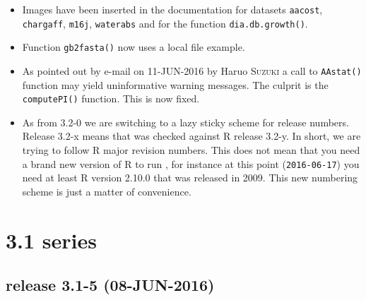 \documentclass{article}
\begin{document}
\begin{itemize}

\item Images have been inserted in the documentation for datasets
\texttt{aacost}, \texttt{chargaff}, \texttt{m16j}, \texttt{waterabs}
and for the function \texttt{dia.db.growth()}.

\item Function \texttt{gb2fasta()} now uses a local file example.

\item As pointed out by e-mail on 11-JUN-2016 by Haruo \textsc{Suzuki} a
call to \texttt{AAstat()} function may yield uninformative warning
messages. The culprit is the \texttt{computePI()} function. This
is now fixed.

\item As from \seqinr{} 3.2-0 we are switching to a lazy sticky
scheme for \seqinr{} release numbers. Release 3.2-x means that
\seqinr{} was checked against R release 3.2-y. In short, we are
trying to follow R major revision numbers. This does not mean
that you need a brand new version of R to run \seqinr{}, for
instance at this point (\texttt{2016-06-17}) you need at least
R version 2.10.0 that was released in 2009. This new numbering
scheme is just a matter of convenience.

\end{itemize}


\section*{3.1 series}

\subsection*{release 3.1-5 (08-JUN-2016)}
\end{document}
